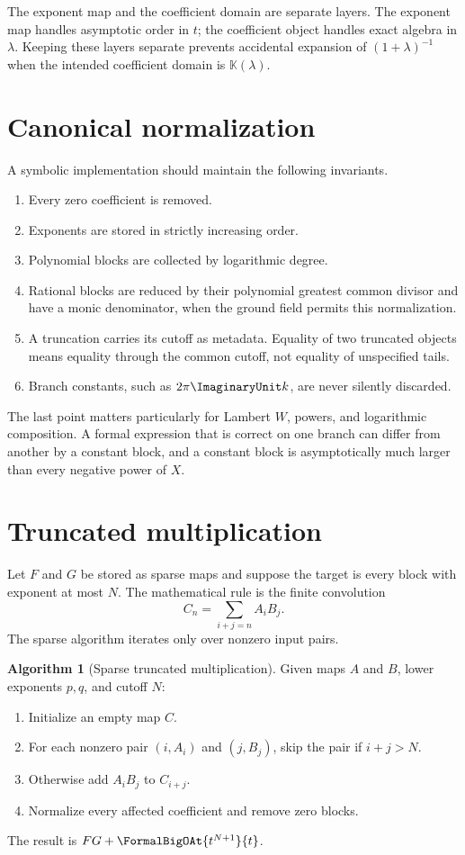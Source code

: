 \documentclass[11pt,openany]{book}
\theoremstyle{definition}
\newtheorem{algorithm}{Algorithm}[chapter]
\theoremstyle{plain}
\theoremstyle{remark}
\newcommand{\K}{\mathbb{K}}
\begin{document}
\begin{checkpointbox}
The exponent map and the coefficient domain are separate layers. The exponent map handles asymptotic order in \(t\); the coefficient object handles exact algebra in \(\lambda\). Keeping these layers separate prevents accidental expansion of \((1+\lambda)^{-1}\) when the intended coefficient domain is \(\K(\lambda)\).
\end{checkpointbox}

\section{Canonical normalization}
A symbolic implementation should maintain the following invariants.
\begin{enumerate}
\item Every zero coefficient is removed.
\item Exponents are stored in strictly increasing order.
\item Polynomial blocks are collected by logarithmic degree.
\item Rational blocks are reduced by their polynomial greatest common divisor and have a monic denominator, when the ground field permits this normalization.
\item A truncation carries its cutoff as metadata. Equality of two truncated objects means equality through the common cutoff, not equality of unspecified tails.
\item Branch constants, such as \(2\pi \ImaginaryUnit k\), are never silently discarded.
\end{enumerate}
The last point matters particularly for Lambert \(W\), powers, and logarithmic composition. A formal expression that is correct on one branch can differ from another by a constant block, and a constant block is asymptotically much larger than every negative power of \(X\).

\section{Truncated multiplication}
Let \(F\) and \(G\) be stored as sparse maps and suppose the target is every block with exponent at most \(N\). The mathematical rule is the finite convolution
\[
 C_n=\sum_{i+j=n}A_iB_j.
\]
The sparse algorithm iterates only over nonzero input pairs.

\begin{algorithm}[Sparse truncated multiplication]\label{alg:sparse-multiply}
Given maps \(A\) and \(B\), lower exponents \(p,q\), and cutoff \(N\):
\begin{enumerate}
\item Initialize an empty map \(C\).
\item For each nonzero pair \((i,A_i)\) and \((j,B_j)\), skip the pair if \(i+j>N\).
\item Otherwise add \(A_iB_j\) to \(C_{i+j}\).
\item Normalize every affected coefficient and remove zero blocks.
\end{enumerate}
The result is \(FG+\FormalBigOAt{t^{N+1}}{t}\).
\end{algorithm}
\end{document}
